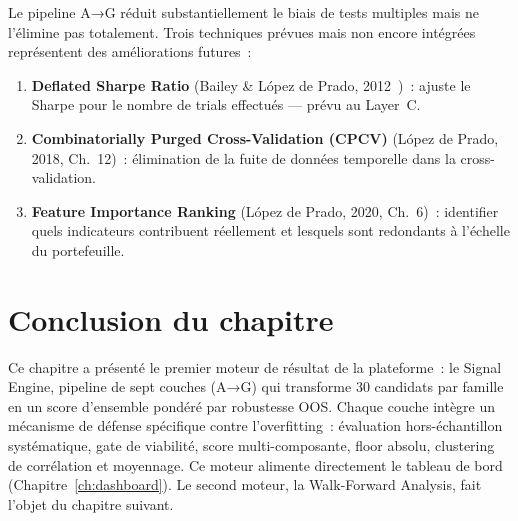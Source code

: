 Le pipeline A→G réduit substantiellement le biais de tests multiples mais ne
l'élimine pas totalement. Trois techniques prévues mais non encore intégrées
représentent des améliorations futures~:

\begin{enumerate}
    \item \textbf{Deflated Sharpe Ratio} (Bailey \& López de Prado, 2012~\cite{bailey2012})~:
    ajuste le Sharpe pour le nombre de trials effectués — prévu au Layer~C.
    \item \textbf{Combinatorially Purged Cross-Validation (CPCV)}
    (López de Prado, 2018, Ch.~12)~: élimination de la fuite de données
    temporelle dans la cross-validation.
    \item \textbf{Feature Importance Ranking}
    (López de Prado, 2020, Ch.~6)~: identifier quels indicateurs contribuent
    réellement et lesquels sont redondants à l'échelle du portefeuille.
\end{enumerate}

\section*{Conclusion du chapitre}

Ce chapitre a présenté le premier moteur de résultat de la plateforme~: le Signal Engine,
pipeline de sept couches (A→G) qui transforme 30 candidats par famille en un score
d'ensemble pondéré par robustesse OOS. Chaque couche intègre un mécanisme de défense
spécifique contre l'overfitting~: évaluation hors-échantillon systématique, gate de
viabilité, score multi-composante, floor absolu, clustering de corrélation et moyennage.
Ce moteur alimente directement le tableau de bord (Chapitre~\ref{ch:dashboard}).
Le second moteur, la Walk-Forward Analysis, fait l'objet du chapitre suivant.
